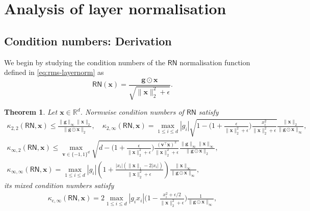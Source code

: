\documentclass[namedate,webpdf,imanum]{ima-authoring-template}
\newcommand{\Real}{\mathbb{R}}
\newcommand{\Matrix}[1]{\mathbf{#1}}
\newcommand{\trans}{\intercal}
\newcommand{\Norm}[3][]{#1\| #2 #1\|_{\mathrm{#3}}}
\newcommand{\hap}{\mathbin{\odot}}
\newcommand{\Layer}[1]{\mathsf{#1}}
\newcommand{\cond}[3][]{\kappa_{\mathrm{#2}} #1( #3 #1)}
\newtheorem{theorem}{Theorem}[section]%
\numberwithin{equation}{section}
\begin{document}
\section{Analysis of layer normalisation}
\label{sec:layernorm}

\subsection{Condition numbers: Derivation}
We begin by studying the condition numbers of the $\Layer{RN}$ normalisation function defined in \eqref{eq:rms-layernorm} as
\begin{equation*}
    \Layer{RN}(\Matrix{x}) = \frac{\Matrix{g} \hap \Matrix{x}}{\sqrt{\Norm{\Matrix{x}}{2}^2 + \epsilon}}.
\end{equation*}

\begin{theorem}
\label{theorem:cond-rms-layernorm}
Let $\Matrix{x} \in \Real^d$.
Normwise condition numbers of $\Layer{RN}$ satisfy
\begin{gather*}
    \cond{2,2}{\Layer{RN}, \Matrix{x}} \leq \frac{\Norm{\Matrix{g}}{\infty} \Norm{\Matrix{x}}{2}}{\Norm{\Matrix{g} \hap \Matrix{x}}{2}}, \quad
    \cond{2,\infty}{\Layer{RN}, \Matrix{x}} = \max_{1 \leq i \leq d} |g_i| \sqrt{1 - \bigg( 1 + \frac{\epsilon}{\Norm{\Matrix{x}}{2}^2 + \epsilon} \bigg) \frac{x_i^2}{\Norm{\Matrix{x}}{2}^2 + \epsilon}} \frac{\Norm{\Matrix{x}}{2}}{\Norm{\Matrix{g} \hap \Matrix{x}}{\infty}}, \\
    \cond{\infty,2}{\Layer{RN}, \Matrix{x}} \leq \max_{\Matrix{v} \in \{ -1,1 \}^d} \sqrt{d - \bigg( 1 + \frac{\epsilon}{\Norm{\Matrix{x}}{2}^2 + \epsilon} \bigg) \frac{(\Matrix{v}^\trans \Matrix{x})^2}{\Norm{\Matrix{x}}{2}^2 + \epsilon}} \frac{\Norm{\Matrix{g}}{\infty} \Norm{\Matrix{x}}{\infty}}{\Norm{\Matrix{g} \hap \Matrix{x}}{2}},\\
    \cond{\infty,\infty}{\Layer{RN}, \Matrix{x}} = \max_{1 \leq i \leq d} |g_i| \left( 1 + \frac{ |x_i| ( \Norm{\Matrix{x}}{1} - 2 |x_i| )}{\Norm{\Matrix{x}}{2}^2 + \epsilon} \right) \frac{\Norm{\Matrix{x}}{\infty}}{\Norm{\Matrix{g} \hap \Matrix{x}}{\infty}},
\end{gather*}
its mixed condition numbers satisfy
\begin{gather*}
    \cond{c,\infty}{\Layer{RN}, \Matrix{x}} = 2 \max_{1 \leq i \leq d} |g_i x_i| \bigg( 1 - \frac{x_i^2 + \epsilon/2}{\Norm{\Matrix{x}}{2}^2 + \epsilon} \bigg) \frac{1}{\Norm{\Matrix{g} \hap \Matrix{x}}{\infty}}, \\

\end{gather*}
\end{theorem}
\end{document}
